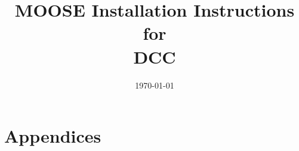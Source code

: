 \documentclass[onehalfspace]{Report}
\title{MOOSE Installation Instructions for \\\vspace{0.2em}DCC}				%
\date{\today}				%
\begin{document}
\begin{singlespace}
  

  \tableofcontents
\end{singlespace}



\pagebreak






\pagebreak
\section*{Appendices}

\begin{appendices}

  
  

\end{appendices}
\end{document}
